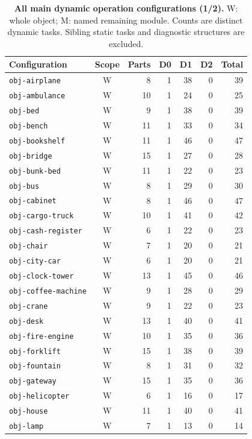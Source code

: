 \begin{table}[!ht]
\centering\footnotesize
\caption{\textbf{All main dynamic operation configurations (1/2).} W: whole object; M: named remaining module. Counts are distinct dynamic tasks. Sibling static tasks and diagnostic structures are excluded.}
\begin{tabularx}{\textwidth}{@{}Xcrrrrr@{}}
\toprule
Configuration & Scope & Parts & D0 & D1 & D2 & Total\\
\midrule
\texttt{obj-airplane} & W & 8 & 1 & 38 & 0 & 39\\
\texttt{obj-ambulance} & W & 10 & 1 & 24 & 0 & 25\\
\texttt{obj-bed} & W & 9 & 1 & 38 & 0 & 39\\
\texttt{obj-bench} & W & 11 & 1 & 33 & 0 & 34\\
\texttt{obj-bookshelf} & W & 11 & 1 & 46 & 0 & 47\\
\texttt{obj-bridge} & W & 15 & 1 & 27 & 0 & 28\\
\texttt{obj-bunk-bed} & W & 11 & 1 & 22 & 0 & 23\\
\texttt{obj-bus} & W & 8 & 1 & 29 & 0 & 30\\
\texttt{obj-cabinet} & W & 8 & 1 & 46 & 0 & 47\\
\texttt{obj-cargo-truck} & W & 10 & 1 & 41 & 0 & 42\\
\texttt{obj-cash-register} & W & 6 & 1 & 22 & 0 & 23\\
\texttt{obj-chair} & W & 7 & 1 & 20 & 0 & 21\\
\texttt{obj-city-car} & W & 6 & 1 & 20 & 0 & 21\\
\texttt{obj-clock-tower} & W & 13 & 1 & 45 & 0 & 46\\
\texttt{obj-coffee-machine} & W & 9 & 1 & 28 & 0 & 29\\
\texttt{obj-crane} & W & 9 & 1 & 22 & 0 & 23\\
\texttt{obj-desk} & W & 13 & 1 & 40 & 0 & 41\\
\texttt{obj-fire-engine} & W & 10 & 1 & 35 & 0 & 36\\
\texttt{obj-forklift} & W & 15 & 1 & 38 & 0 & 39\\
\texttt{obj-fountain} & W & 8 & 1 & 31 & 0 & 32\\
\texttt{obj-gateway} & W & 15 & 1 & 35 & 0 & 36\\
\texttt{obj-helicopter} & W & 6 & 1 & 16 & 0 & 17\\
\texttt{obj-house} & W & 11 & 1 & 40 & 0 & 41\\
\texttt{obj-lamp} & W & 7 & 1 & 13 & 0 & 14\\

\end{tabularx}
\end{table}
